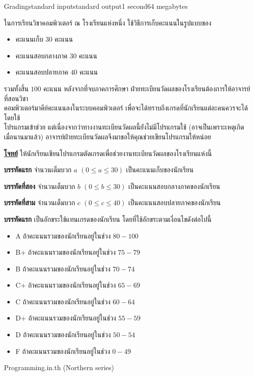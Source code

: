 \documentclass[11pt,a4paper]{article}
\begin{document}
\begin{problem}{Grading}{standard input}{standard output}{1 second}{64 megabytes}

ในการเรียนวิชาคอมพิวเตอร์ ณ โรงเรียนแห่งหนึ่ง ใช้วิธีการเก็บคะแนนในรูปแบบของ

\begin{itemize}
	\item คะแนนเก็บ $30$ คะแนน
    \item คะแนนสอบกลางภาค $30$ คะแนน
    \item คะแนนสอบปลายภาค $40$ คะแนน
\end{itemize} 
   
รวมทั้งสิ้น $100$ คะแนน หลังจากที่จบภาคการศึกษา ฝ่ายทะเบียนวัดผลของโรงเรียนต้องการให้อาจารย์ที่สอนวิชา\\คอมพิวเตอร์มาคีย์คะแนนลงในระบบคอมพิวเตอร์ เพื่อจะได้ทราบถึงเกรดที่นักเรียนแต่ละคนควรจะได้ โดยใช้\\โปรแกรมเข้าช่วย แต่เนื่องจากว่าทางงานทะเบียนวัดผลนี้ยังไม่มีโปรแกรมใช้ (อาจเป็นเพราะเหตุเกิดเมื่อนานมาแล้ว) อาจารย์ฝ่ายทะเบียนวัดผลจึงมาขอให้คุณช่วยเขียนโปรแกรมให้หน่อย

\underline{\textbf{โจทย์}} ให้นักเรียนเขียนโปรแกรมตัดเกรดเพื่อช่วยงานทะเบียนวัดผลของโรงเรียนแห่งนี้

\InputFile

\textbf{บรรทัดแรก} จำนวนเต็มบวก $a$ $(0 \leq a \leq 30)$ เป็นคะแนนเก็บของนักเรียน

\textbf{บรรทัดที่สอง} จำนวนเต็มบวก $b$ $(0 \leq b \leq 30)$ เป็นคะแนนสอบกลางภาคของนักเรียน

\textbf{บรรทัดที่สาม} จำนวนเต็มบวก $c$ $(0 \leq c \leq 40)$ เป็นคะแนนสอบปลายภาคของนักเรียน

\OutputFile

\textbf{บรรทัดแรก} เป็นอักขระใช้แทนเกรดของนักเรียน โดยที่ใช้อักขระตามเงื่อนไขดังต่อไปนี้
\begin{itemize}
    \item A ถ้าคะแนนรวมของนักเรียนอยู่ในช่วง $80 - 100$
    \item B+ ถ้าคะแนนรวมของนักเรียนอยู่ในช่วง $75 - 79$
    \item B ถ้าคะแนนรวมของนักเรียนอยู่ในช่วง $70 - 74$
    \item C+ ถ้าคะแนนรวมของนักเรียนอยู่ในช่วง $65 - 69$
    \item C ถ้าคะแนนรวมของนักเรียนอยู่ในช่วง $60 - 64$
    \item D+ ถ้าคะแนนรวมของนักเรียนอยู่ในช่วง $55 - 59$
    \item D ถ้าคะแนนรวมของนักเรียนอยู่ในช่วง $50 - 54$
    \item F ถ้าคะแนนรวมของนักเรียนอยู่ในช่วง $0 - 49$
\end{itemize}
\Examples

\begin{example}
%
\end{example}

\Source

 Programming.in.th (Northern series)

\end{problem}
\end{document}
